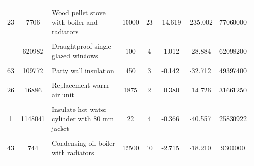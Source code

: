 \begin{table}[!h]
{\begin{tabular}[t]{cc p{7cm} ccccc}
\cellcolor{gray!10}{30} & \cellcolor{gray!10}{85158} & \cellcolor{gray!10}{Fan assisted storage heaters and dual immersion cylinder} & \cellcolor{gray!10}{1124} & \cellcolor{gray!10}{16} & \cellcolor{gray!10}{-0.754} & \cellcolor{gray!10}{-67.301} & \cellcolor{gray!10}{95700560}\\
23 & 7706 & Wood pellet stove with boiler and radiators & 10000 & 23 & -14.619 & -235.002 & 77060000\\
\cellcolor{gray!10}{25} & \cellcolor{gray!10}{75892} & \cellcolor{gray!10}{Fan assisted storage heaters} & \cellcolor{gray!10}{999} & \cellcolor{gray!10}{9} & \cellcolor{gray!10}{-0.751} & \cellcolor{gray!10}{-58.682} & \cellcolor{gray!10}{75797135}\\
\addlinespace
10 & 620982 & Draughtproof single-glazed windows & 100 & 4 & -1.012 & -28.884 & 62098200\\
\cellcolor{gray!10}{37} & \cellcolor{gray!10}{19747} & \cellcolor{gray!10}{Install condensing boiler} & \cellcolor{gray!10}{2600} & \cellcolor{gray!10}{14} & \cellcolor{gray!10}{-3.988} & \cellcolor{gray!10}{-47.163} & \cellcolor{gray!10}{51342200}\\
63 & 109772 & Party wall insulation & 450 & 3 & -0.142 & -32.712 & 49397400\\
\cellcolor{gray!10}{49} & \cellcolor{gray!10}{67828} & \cellcolor{gray!10}{Heat recovery system for mixer showers} & \cellcolor{gray!10}{655} & \cellcolor{gray!10}{1} & \cellcolor{gray!10}{-0.089} & \cellcolor{gray!10}{-7.041} & \cellcolor{gray!10}{44427340}\\
26 & 16886 & Replacement warm air unit & 1875 & 2 & -0.380 & -14.726 & 31661250\\
\addlinespace
\cellcolor{gray!10}{22} & \cellcolor{gray!10}{2870} & \cellcolor{gray!10}{Replace boiler with biomass boiler} & \cellcolor{gray!10}{10000} & \cellcolor{gray!10}{15} & \cellcolor{gray!10}{-11.784} & \cellcolor{gray!10}{-106.260} & \cellcolor{gray!10}{28700000}\\
1 & 1148041 & Insulate hot water cylinder with 80 mm jacket & 22 & 4 & -0.366 & -40.557 & 25830922\\
\cellcolor{gray!10}{9} & \cellcolor{gray!10}{10160} & \cellcolor{gray!10}{Secondary glazing to single glazed windows} & \cellcolor{gray!10}{1250} & \cellcolor{gray!10}{2} & \cellcolor{gray!10}{-0.661} & \cellcolor{gray!10}{-12.716} & \cellcolor{gray!10}{12700000}\\
43 & 744 & Condensing oil boiler with radiators & 12500 & 10 & -2.715 & -18.210 & 9300000\\
\cellcolor{gray!10}{36} & \cellcolor{gray!10}{425} & \cellcolor{gray!10}{Replace heating unit with condensing unit} & \cellcolor{gray!10}{2600} & \cellcolor{gray!10}{3} & \cellcolor{gray!10}{-0.396} & \cellcolor{gray!10}{-22.771} & \cellcolor{gray!10}{1105000}\\
\bottomrule
\end{tabular}}
\end{table}